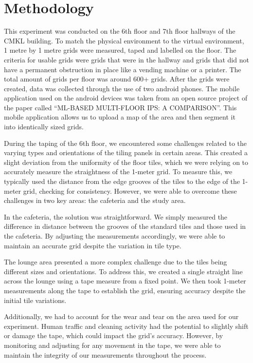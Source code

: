 \documentclass[conference]{IEEEtran}
\begin{document}
	
	\section{Methodology}
	This experiment was conducted on the 6th floor and 7th floor hallways of the CMKL building. To match the physical environment to the virtual environment, 1 metre by 1 metre grids were measured, taped and labelled on the floor. The criteria for usable grids were grids that were in the hallway and grids that did not have a permanent obstruction in place like a vending machine or a printer. The total amount of grids per floor was around 600+ grids. After the grids were created, data was collected through the use of two android phones. The mobile application used on the android devices was taken from an open source project of the paper called “ML-BASED MULTI-FLOOR IPS: A COMPARISON”\cite{bgp4}. This mobile application allows us to upload a map of the area and then segment it into identically sized grids.
	
	
	During the taping of the 6th floor, we encountered some challenges related to the varying types and orientations of the tiling panels in certain areas. This created a slight deviation from the uniformity of the floor tiles, which we were relying on to accurately measure the straightness of the 1-meter grid. To measure this, we typically used the distance from the edge grooves of the tiles to the edge of the 1-meter grid, checking for consistency. However, we were able to overcome these challenges in two key areas: the cafeteria and the study area.
	
	In the cafeteria, the solution was straightforward. We simply measured the difference in distance between the grooves of the standard tiles and those used in the cafeteria. By adjusting the measurements accordingly, we were able to maintain an accurate grid despite the variation in tile type.
	
	The lounge area presented a more complex challenge due to the tiles being different sizes and orientations. To address this, we created a single straight line across the lounge using a tape measure from a fixed point. We then took 1-meter measurements along the tape to establish the grid, ensuring accuracy despite the initial tile variations.
	
	Additionally, we had to account for the wear and tear on the area used for our experiment. Human traffic and cleaning activity had the potential to slightly shift or damage the tape, which could impact the grid's accuracy. However, by monitoring and adjusting for any movement in the tape, we were able to maintain the integrity of our measurements throughout the process.
	
\end{document}
